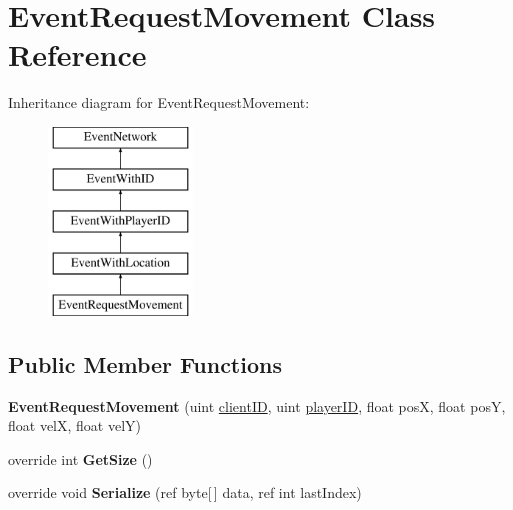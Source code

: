 \hypertarget{class_event_request_movement}{\section{Event\-Request\-Movement Class Reference}
\label{class_event_request_movement}
}
Inheritance diagram for Event\-Request\-Movement\-:\begin{figure}[H]
\begin{center}
\leavevmode
\includegraphics[height=5.000000cm]{class_event_request_movement}
\end{center}
\end{figure}
\subsection*{Public Member Functions}
\begin{DoxyCompactItemize}
\item 
\hypertarget{class_event_request_movement_ac23cc3d2b652f582980b751ec41aeb91}{{\bfseries Event\-Request\-Movement} (uint \hyperlink{class_event_with_i_d_a4b58cdaef622cb06405b6829a160cef5}{client\-I\-D}, uint \hyperlink{class_event_with_player_i_d_a41340c3a625e17bb56c31cc937db338e}{player\-I\-D}, float pos\-X, float pos\-Y, float vel\-X, float vel\-Y)}\label{class_event_request_movement_ac23cc3d2b652f582980b751ec41aeb91}

\item 
\hypertarget{class_event_request_movement_a67f08827339e593a94b9c3c183af89cf}{override int {\bfseries Get\-Size} ()}\label{class_event_request_movement_a67f08827339e593a94b9c3c183af89cf}

\item 
\hypertarget{class_event_request_movement_a43b5a9fa68ad25626bb08cf5dbb13d6c}{override void {\bfseries Serialize} (ref byte\mbox{[}$\,$\mbox{]} data, ref int last\-Index)}\label{class_event_request_movement_a43b5a9fa68ad25626bb08cf5dbb13d6c}

\end{DoxyCompactItemize}
